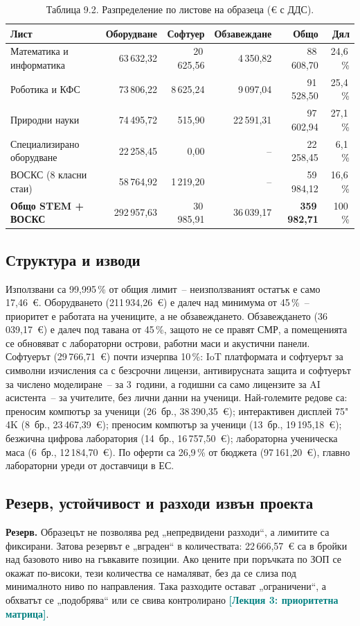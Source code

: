 \documentclass[11pt,a4paper]{article}
\newcommand{\lecturetag}[1]{\textcolor{teal}{\small\bfseries[#1]}}
\newcommand{\NumFurn}{36\,039,17~€}
\newcommand{\NumEquip}{211\,934,26~€}
\newcommand{\NumSoft}{29\,766,71~€}
\newcommand{\PctUse}{99,995\,\%}
\newcommand{\NumLeftTotal}{17,46~€}
\newcommand{\NumFlexBuffer}{22\,666,57~€}
\newcommand{\NumOfferTotal}{97\,161,20~€}
\newcommand{\PctOfferTotal}{26,9\,\%}
\newcommand{\TopLines}{преносим компютър за ученици (26~бр., 38\,390,35~€); интерактивен дисплей 75" 4K (8~бр., 23\,467,39~€); преносим компютър за ученици (13~бр., 19\,195,18~€); безжична цифрова лаборатория (14~бр., 16\,757,50~€); лабораторна ученическа маса (6~бр., 12\,184,70~€)}
\begin{document}
\begin{table}[h]\centering\footnotesize
\begin{tabularx}{\textwidth}{@{}X r r r r r@{}}
\toprule
\textbf{Лист} & \textbf{Оборудване} & \textbf{Софтуер} & \textbf{Обзавеждане} & \textbf{Общо} & \textbf{Дял} \\
\midrule
Математика и информатика & 63\,632,32 & 20\,625,56 & 4\,350,82 & 88\,608,70 & 24,6\,\% \\
Роботика и КФС & 73\,806,22 & 8\,625,24 & 9\,097,04 & 91\,528,50 & 25,4\,\% \\
Природни науки & 74\,495,72 & 515,90 & 22\,591,31 & 97\,602,94 & 27,1\,\% \\
Специализирано оборудване & 22\,258,45 & 0,00 & – & 22\,258,45 & 6,1\,\% \\
ВОСКС (8 класни стаи) & 58\,764,92 & 1\,219,20 & – & 59\,984,12 & 16,6\,\% \\
\midrule
\textbf{Общо STEM + ВОСКС} & 292\,957,63 & 30\,985,91 & 36\,039,17 & \textbf{359\,982,71} & 100\,\% \\
\bottomrule
\end{tabularx}
\caption*{\footnotesize Таблица 9.2. Разпределение по листове на образеца (€ с ДДС).}
\end{table}


\subsection{Структура и изводи}
Използвани са \PctUse{} от общия лимит~– неизползваният остатък е само \NumLeftTotal. Оборудването (\NumEquip) е далеч над минимума от 45\,\%~– приоритет е работата на учениците, а не обзавеждането. Обзавеждането (\NumFurn) е далеч под тавана от 45\,\%, защото не се правят СМР, а помещенията се обновяват с лабораторни острови, работни маси и акустични панели. Софтуерът (\NumSoft) почти изчерпва 10\,\%: IoT платформата и софтуерът за символни изчисления са с безсрочни лицензи, антивирусната защита и софтуерът за числено моделиране~– за 3~години, а годишни са само лицензите за AI асистента~– за учителите, без лични данни на ученици. Най-големите редове са: \TopLines. По оферти са \PctOfferTotal{} от бюджета (\NumOfferTotal), главно лабораторни уреди от доставчици в ЕС.

\subsection{Резерв, устойчивост и разходи извън проекта}
\textbf{Резерв.} Образецът не позволява ред „непредвидени разходи“, а лимитите са фиксирани. Затова резервът е „вграден“ в количествата: \NumFlexBuffer{} са в бройки над базовото ниво на гъвкавите позиции. Ако цените при поръчката по ЗОП се окажат по-високи, тези количества се намаляват, без да се слиза под минималното ниво по направления. Така разходите остават „ограничени“, а обхватът се „подобрява“ или се свива контролирано \lecturetag{Лекция 3: приоритетна матрица}.
\end{document}
